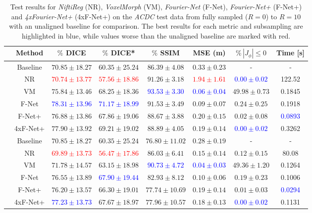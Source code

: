 \begin{table}[h] %
	\footnotesize
	\centering
	\caption{Test results for \emph{NiftiReg} (NR), \emph{VoxelMorph} (VM), \emph{Fourier-Net} (F-Net), \emph{Fourier-Net+} (F-Net+) and \emph{4xFourier-Net+} (4xF-Net+) on the \emph{ACDC} test data from fully sampled ($R=0$) to $R=10$ with an unaligned baseline for comparison. The best results for each metric and subsampling are highlighted in blue, while values worse than the unaligned baseline are marked with red.}
	\label{tab:ComparisonSubsamplingACDC}
	\begin{tabular}{c c c c c c c c} 
		\toprule
		 & Method & $\%$ DICE & $\%$ DICE* & $\%$ SSIM & MSE (m) & $\% \, |J_{\phi}|\leq0$ & Time [s] \\
		\midrule
		\multirow{6}{*}{\rotatebox{90}{$R=0$}} & Baseline & $70.85 \pm 18.27$  & $60.35 \pm 25.24$ & $86.39 \pm 4.08$ & $0.33 \pm 0.23$ & - & -\\  
		 & NR & \textcolor{red}{$70.74 \pm 13.77$} & \textcolor{red}{$57.56 \pm 18.86$} & $91.26 \pm 3.18$ & \textcolor{red}{$1.94 \pm 1.61$} & \textcolor{blue}{$0.00 \pm 0.02$} & 122.52\\
		 & VM & $75.84 \pm 13.46$ & $68.25 \pm 18.36$ & \textcolor{blue}{$93.53 \pm 3.30$} & \textcolor{blue}{$0.06 \pm 0.04$} & $49.98 \pm 0.73$ & 0.1845\\ 
		 & F-Net & \textcolor{blue}{$78.31 \pm 13.96$} & \textcolor{blue}{$71.17 \pm 18.99$} & $91.53 \pm 3.49$ & $0.09 \pm 0.07$ & $0.24 \pm 0.25$ & 0.1918\\ 
		 & F-Net+ & $76.88 \pm 13.86$ & $67.86 \pm 19.06$ & $88.67 \pm 3.88$ & $0.20 \pm 0.15$ & $0.02 \pm 0.08$ & \textcolor{blue}{0.0893} \\ 
		 & 4xF-Net+ & $77.90 \pm 13.92$ & $69.21 \pm 19.02$  & $88.89 \pm 4.05$ & $0.19 \pm 0.14$ & \textcolor{blue}{$0.00 \pm 0.02$} & 0.3262\\ 
		 	
		\midrule
		\multirow{6}{*}{\rotatebox{90}{$R=4$}} & Baseline & $70.85 \pm 18.27$ & $60.35 \pm 25.24$ & $76.80 \pm 11.02$ & $0.28 \pm 0.19$ & - & -\\  
		 & NR & \textcolor{red}{$69.89 \pm 13.73$} & \textcolor{red}{$56.47 \pm 17.86$} & $86.03 \pm 6.41$ & $0.15 \pm 0.14$ & $ 0.12 \pm 0.15$ & 80.08 \\  
		 & VM & $71.78 \pm 14.57$ & $63.15 \pm 18.98$ & \textcolor{blue}{$90.73 \pm 4.72$} & \textcolor{blue}{$0.04 \pm 0.03$} & $49.36 \pm 1.20$ & 0.1264\\  	
		 & F-Net & $76.55 \pm 13.89$ & \textcolor{blue}{$67.90 \pm 19.44$} & $82.93 \pm 8.12$ & $0.10 \pm 0.06$ & $0.19 \pm 0.23$ & 0.1006\\ 
		 & F-Net+ & $76.20 \pm 13.57$ & $66.30 \pm 19.01$ & $77.74 \pm 10.69$ & $0.19 \pm 0.14$ & $0.01 \pm 0.03$ & \textcolor{blue}{0.0294}\\ 
		 & 4xF-Net+ & \textcolor{blue}{$77.23 \pm 13.73$} & $67.67 \pm 18.97$ & $77.96 \pm 10.57$ & $0.18 \pm 0.13$ & \textcolor{blue}{$0.00 \pm 0.02$} & 0.1131\\   
		

\end{tabular}
\end{table}

